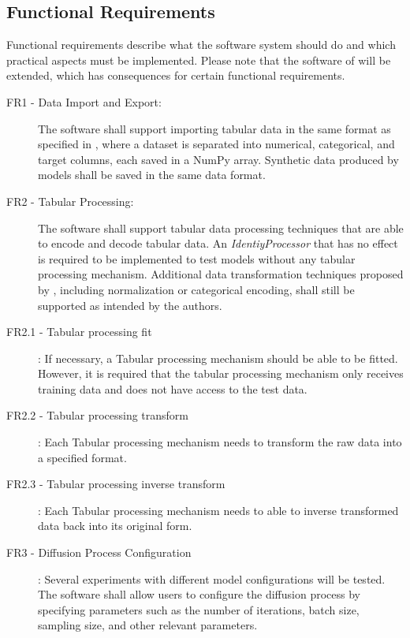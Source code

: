 \subsection*{Functional Requirements}
\label{sec:func_requirements}
Functional requirements describe what the software system should do and which practical aspects must be implemented.
Please note that the software of \cite{kotelnikov2022TabDDPMModellingTabular} will be extended, which has consequences for certain functional requirements.

\begin{description}
    \item[FR1 - Data Import and Export:]
    The software shall support importing tabular data in the same format as specified in \cite{kotelnikov2022TabDDPMModellingTabular},
    where a dataset is separated into numerical, categorical, and target columns, each saved in a NumPy \cite{harris2020array} array. 
    Synthetic data produced by models shall be saved in the same data format.

    \item[FR2 - Tabular Processing:]
    The software shall support tabular data processing techniques that are able to encode and decode tabular data. 
    An \textit{IdentiyProcessor} that has no effect is required to be implemented to test models without any tabular processing mechanism.
    Additional data transformation techniques proposed by \cite{kotelnikov2022TabDDPMModellingTabular}, including normalization or categorical encoding, shall still be supported as intended by the authors.

    \item[FR2.1 - Tabular processing fit]:
    If necessary, a Tabular processing mechanism should be able to be fitted.
    However, it is required that the tabular processing mechanism only receives training data and does not have access to the test data.

    \item[FR2.2 - Tabular processing transform]:
    Each Tabular processing mechanism needs to transform the raw data into a specified format.

    \item[FR2.3 - Tabular processing inverse transform]:
    Each Tabular processing mechanism needs to able to inverse transformed data back into its original form.

    \item[FR3 - Diffusion Process Configuration]:
    Several experiments with different model configurations will be tested.
    The software shall allow users to configure the diffusion process by specifying parameters such as the number of iterations, batch size, sampling size, and other relevant parameters.


\end{description}
